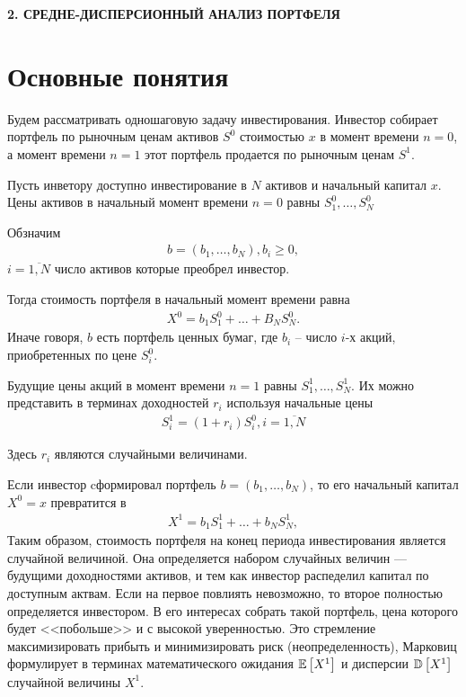 \newpage
\begin{center}
	\textbf{\large 2. СРЕДНЕ-ДИСПЕРСИОННЫЙ АНАЛИЗ ПОРТФЕЛЯ}
\end{center}

\section{Основные понятия}

Будем рассматривать одношаговую задачу инвестирования. Инвестор собирает портфель по рыночным ценам активов $S^0$
стоимостью $x$ в момент времени $n=0$, а момент времени $n=1$ этот портфель продается по рыночным ценам $S^1$.

Пусть инветору доступно инвестирование в $N$ активов и начальный капитал $x$. 
Цены активов в начальный момент времени $n=0$ равны
$S_1^0, \dots, S_N^0$

Обзначим 
\begin{align}
	b = (b_1, \dots, b_N), b_i \ge 0,
\end{align}
$i=\overline{1, N}$ число активов которые преобрел инвестор.

Тогда стоимость портфеля в начальный момент времени равна
\begin{align}
	X^0 = b_1 S_1^0 + \dots + B_N S_N^0.
\end{align}
Иначе говоря, $b$ есть портфель ценных бумаг, где $b_i$ -- число $i$-х акций, приобретенных по цене $S_i^0$.

Будущие цены акций в момент времени $n=1$ равны $S_1^1, \dots, S_N^1$. 
Их можно представить в терминах доходностей $r_i$ используя начальные цены
\begin{align}
	S_i^1 = (1 + r_i) S_i^0, i=\overline{1, N}
\end{align}

Здесь $r_i$ являются случайными величинами.


Если инвестор cформировал портфель $b = (b_1, \dots, b_N )$, то его начальный капитал $X^0 = x$ превратится в 
\begin{align}
	X^1 = b_1 S_1^1 + \dots + b_N S_N^1,
\end{align}
Таким образом, стоимость портфеля на конец периода инвестирования является случайной величиной. 
Она определяется набором случайных величин --- будущими доходностями активов, и тем как инвестор распеделил капитал
по доступным актвам. Если на первое повлиять невозможно, то второе полностью определяется инвестором.
В его интересах собрать такой портфель, цена которого будет <<побольше>> и с высокой уверенностью.
Это стремление максимизировать прибыть и минимизировать риск (неопределенность), Марковиц формулирует в терминах
математического ожидания $\mathbb{E}\left[X^1\right]$ и дисперсии $\mathbb{D}\left[X^1\right]$ случайной величины $X^1$.

